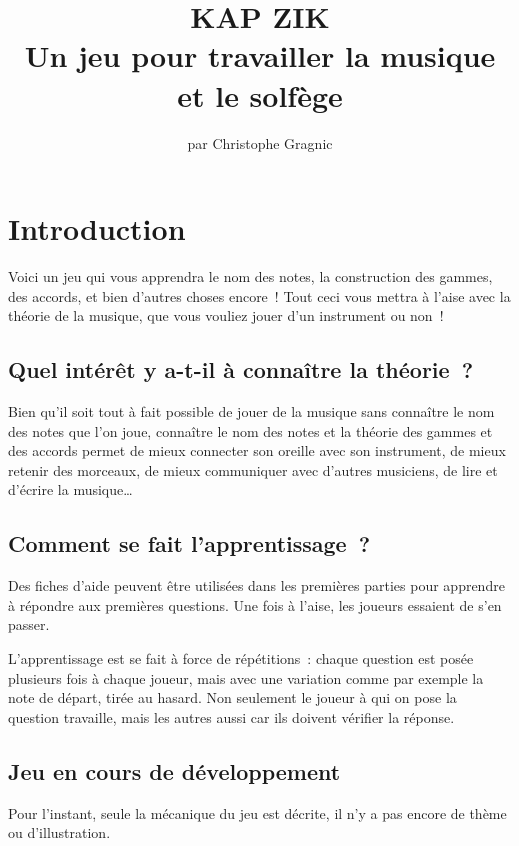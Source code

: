 \documentclass[11pt]{article}
\title{\vspace{-5em}
KAP ZIK \\
\vspace{1em}
Un jeu pour travailler la musique et le solfège}
\author{par Christophe Gragnic}
\date{}
\begin{document}
\maketitle

\setcounter{tocdepth}{2}
\tableofcontents

\newpage

\section{Introduction}

Voici un jeu qui vous apprendra le nom des notes, la construction des
gammes, des accords, et bien d’autres choses encore ! Tout ceci vous mettra
à l’aise avec la théorie de la musique, que vous vouliez jouer d’un instrument
ou non !

\subsection{Quel intérêt y a-t-il à connaître la théorie ?}

Bien qu’il soit tout à fait possible de jouer de la musique sans connaître le
nom des notes que l’on joue, connaître le nom des notes et la théorie des
gammes et des accords permet de mieux connecter son oreille avec son instrument,
de mieux retenir des morceaux, de mieux communiquer avec d’autres musiciens,
de lire et d’écrire la musique…

\subsection{Comment se fait l’apprentissage ?}

Des fiches d’aide peuvent être utilisées dans les premières parties pour
apprendre à répondre aux premières questions. Une fois à l’aise, les joueurs
essaient de s’en passer.

L’apprentissage est se fait à force de répétitions : chaque question est posée
plusieurs fois à chaque joueur, mais avec une variation comme par exemple la
note de départ, tirée au hasard. Non seulement le joueur à qui on pose la
question travaille, mais les autres aussi car ils doivent vérifier la réponse.

\subsection{Jeu en cours de développement}

Pour l’instant, seule la mécanique du jeu est décrite, il n’y a pas encore de
thème ou d’illustration.
\end{document}
